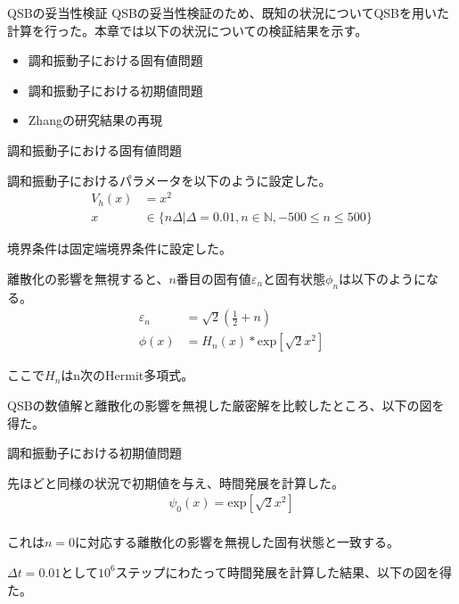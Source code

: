 \documentclass[a4paper, lualatex]{bxjsarticle}
\begin{document}
\begin{section}{QSBの妥当性検証}
    QSBの妥当性検証のため、既知の状況についてQSBを用いた計算を行った。本章では以下の状況についての検証結果を示す。
    \begin{itemize}
        \item 調和振動子における固有値問題
        \item 調和振動子における初期値問題
        \item Zhangの研究結果の再現
    \end{itemize}
    \begin{subsection}{調和振動子における固有値問題}
        \par 調和振動子におけるパラメータを以下のように設定した。
        \begin{align}
         V_h(x) &= x^2 \nonumber\\
            x&\in \{n\varDelta|\varDelta=0.01, n\in \mathbb{N}, -500\le n\le 500\}
        \end{align}
        \par 境界条件は固定端境界条件に設定した。
        \par 離散化の影響を無視すると、$n$番目の固有値$\varepsilon_n$と固有状態$\phi_n$は以下のようになる。
        \begin{align}
         \varepsilon_n&=\sqrt{2}\left(\frac{1}{2}+n\right)\nonumber\\
            \phi(x)&=H_n(x)*\mathrm{exp}[\sqrt{2}x^2]
        \end{align}
        \par ここで$H_n$はn次のHermit多項式。
        \par QSBの数値解と離散化の影響を無視した厳密解を比較したところ、以下の図を得た。
        \par %
    \end{subsection}
    \begin{subsection}{調和振動子における初期値問題}
        \par 先ほどと同様の状況で初期値を与え、時間発展を計算した。
        \begin{align}
         \psi_0(x)=\mathrm{exp}[\sqrt{2}x^2]\nonumber\\
        \end{align}
        \par これは$n=0$に対応する離散化の影響を無視した固有状態と一致する。
        \par $\varDelta t=0.01$として$10^{6}$ステップにわたって時間発展を計算した結果、以下の図を得た。
        \par %

\end{subsection}
\end{section}
\end{document}
